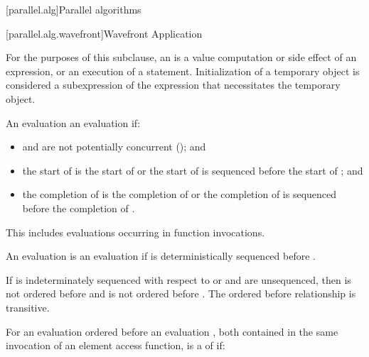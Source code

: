 
[parallel.alg]{Parallel algorithms}

[parallel.alg.wavefront]{Wavefront Application}

\pnum
For the purposes of this subclause, an  is a value
computation or side effect of an expression, or an execution of a statement.
Initialization of a temporary object is considered a subexpression of the
expression that necessitates the temporary object.

\pnum
An evaluation   an evaluation  if:

\begin{itemize}
\item {} and  are not potentially concurrent (); and
\item the start of  is the start of  or the start of  is sequenced before the start of ; and
\item the completion of  is the completion of  or the completion of  is sequenced before the completion of .
\end{itemize}

\begin{note}
This includes evaluations occurring in function invocations.
\end{note}

\pnum
An evaluation  is  an evaluation  if  is deterministically sequenced before .
\begin{note}If  is indeterminately sequenced with respect to  or  and  are unsequenced, then  is not ordered
before  and  is not ordered before .
The ordered before relationship is transitive.\end{note}

\pnum
For an evaluation  ordered before an evaluation , both contained in the
same invocation of an element access function,  is a  of  if:

